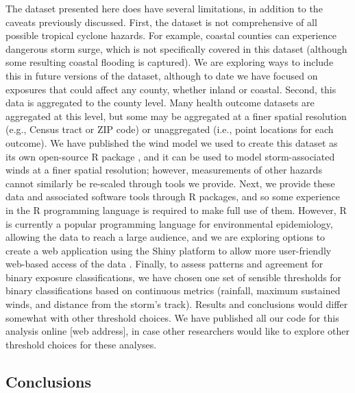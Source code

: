 The dataset presented here does have several limitations, in addition to the
caveats previously discussed. First, the dataset is not comprehensive of all
possible tropical cyclone hazards. For example, coastal counties can experience
dangerous storm surge, which is not specifically covered in this dataset
(although some resulting coastal flooding is captured). We are exploring ways to
include this in future versions of the dataset, although to date we have
focused on exposures that could affect any county, whether inland or coastal.
Second, this data is aggregated to the county level. Many health outcome
datasets are aggregated at this level, but some may be aggregated at a finer
spatial resolution (e.g., Census tract or ZIP code) or unaggregated (i.e., point locations
for each outcome). We have published the wind
model we used to create this dataset as its own open-source R package
\parencite{stormwindmodel}, and it can be used to model
storm-associated winds at a finer spatial resolution; however, measurements of
other hazards cannot similarly be re-scaled through tools we provide. Next,
we provide these data and associated software tools through R packages, and so
some experience in the R programming language is required to make full use of
them. However, R is currently a popular programming language for environmental
epidemiology, allowing the data to reach a large audience, and we are exploring
options to create a web application using the Shiny platform to allow more
user-friendly web-based access of the data \parencite{shiny2019}. 
Finally, to assess patterns and agreement for binary exposure classifications, 
we have chosen one set of sensible thresholds for binary classifications based
on continuous metrics (rainfall, maximum sustained winds, and distance from 
the storm's track). Results and conclusions would differ somewhat with other
threshold choices. We have published all our code for this analysis online
[web address], in case other researchers would like to explore other 
threshold choices for these analyses.

\subsection*{Conclusions}

